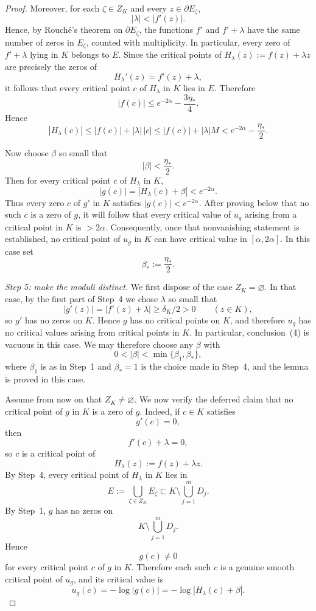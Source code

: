 \documentclass[12pt]{amsart}
\theoremstyle{definition}
\theoremstyle{remark}
\begin{document}
\begin{proof}
Moreover, for each $\zeta\in Z_K$ and every $z\in \partial E_\zeta$,
\[
|\lambda|<|f'(z)|.
\]
Hence, by Rouch\'e's theorem on $\partial E_\zeta$, the functions $f'$ and $f'+\lambda$
have the same number of zeros in $E_\zeta$, counted with multiplicity. In particular,
every zero of $f'+\lambda$ lying in $K$ belongs to $E$. Since the critical points of
$H_\lambda(z):=f(z)+\lambda z$ are precisely the zeros of
\[
H_\lambda'(z)=f'(z)+\lambda,
\]
it follows that every critical point $c$ of $H_\lambda$ in $K$ lies in $E$. Therefore
\[
|f(c)|\le e^{-2\alpha}-\frac{3\eta_*}{4}.
\]
Hence
\[
|H_\lambda(c)|
\le |f(c)|+|\lambda|\,|c|
\le |f(c)|+|\lambda|M
<
e^{-2\alpha}-\frac{\eta_*}{2}.
\]

Now choose $\beta$ so small that
\[
|\beta|<\frac{\eta_*}{2}.
\]
Then for every critical point $c$ of $H_\lambda$ in $K$,
\[
|g(c)|=|H_\lambda(c)+\beta|<e^{-2\alpha}.
\]
Thus every zero $c$ of $g'$ in $K$ satisfies $|g(c)|<e^{-2\alpha}$.
After proving below that no such $c$ is a zero of $g$, it will follow that every
critical value of $u_g$ arising from a critical point in $K$ is $>2\alpha$.
Consequently, once that nonvanishing statement is established, no critical point
of $u_g$ in $K$ can have critical value in $[\alpha,2\alpha]$.
In this case set
\[
\beta_*:=\frac{\eta_*}{2}.
\]

\noindent\textit{Step 5: make the moduli distinct.} We first dispose of the case $Z_K=\varnothing$.
In that case, by the first part of Step~4 we chose $\lambda$ so small that
\[
|g'(z)| = |f'(z)+\lambda| \ge \delta_K/2 > 0
\qquad (z\in K),
\]
so $g'$ has no zeros on $K$. Hence $g$ has no critical points on $K$, and therefore
$u_g$ has no critical values arising from critical points in $K$. In particular,
conclusion~(4) is vacuous in this case. We may therefore choose any $\beta$ with
\[
0<|\beta|<\min\{\beta_1,\beta_*\},
\]
where $\beta_1$ is as in Step~1 and $\beta_*=1$ is the choice made in Step~4, and
the lemma is proved in this case.

Assume from now on that $Z_K\neq\varnothing$. We now verify the deferred claim
that no critical point of $g$ in $K$ is a zero of $g$. Indeed, if $c\in K$ satisfies
\[
g'(c)=0,
\]
then
\[
f'(c)+\lambda = 0,
\]
so $c$ is a critical point of
\[
H_\lambda(z) := f(z)+\lambda z.
\]
By Step~4, every critical point of $H_\lambda$ in $K$ lies in
\[
E := \bigcup_{\zeta\in Z_K} E_\zeta \subset K \setminus \bigcup_{j=1}^m D_j.
\]
By Step~1, $g$ has no zeros on
\[
K \setminus \bigcup_{j=1}^m D_j.
\]
Hence
\[
g(c)\neq 0
\]
for every critical point $c$ of $g$ in $K$. Therefore each such $c$ is a genuine smooth
critical point of $u_g$, and its critical value is
\[
u_g(c) = -\log|g(c)| = -\log|H_\lambda(c)+\beta|.
\]


\end{proof}
\end{document}
